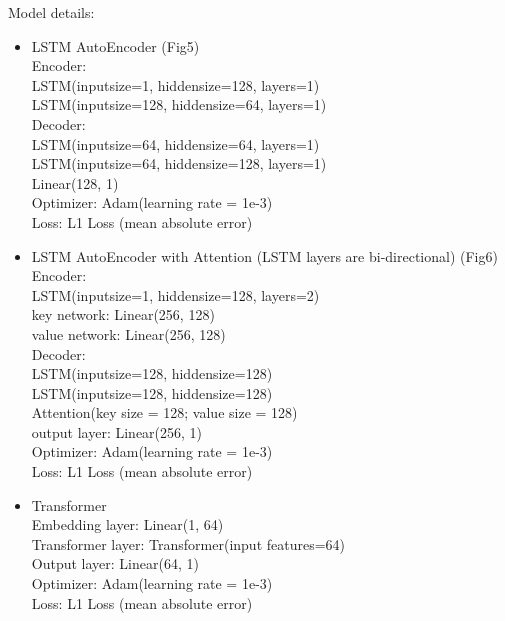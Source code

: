\documentclass{article}
\begin{document}
Model details:

\begin{itemize}
    \item LSTM AutoEncoder (Fig5)\\
    Encoder: \\
    LSTM(inputsize=1, hiddensize=128, layers=1)\\
    LSTM(inputsize=128, hiddensize=64, layers=1) \\
             
    Decoder: \\
    LSTM(inputsize=64, hiddensize=64, layers=1)\\
    LSTM(inputsize=64, hiddensize=128, layers=1)\\
    Linear(128, 1) \\
    
    Optimizer: Adam(learning rate = 1e-3)\\
    Loss: L1 Loss (mean absolute error)
    
    
    \item LSTM AutoEncoder with Attention (LSTM layers are bi-directional) (Fig6) \\
    Encoder: \\
    LSTM(inputsize=1, hiddensize=128, layers=2)\\
    key network: Linear(256, 128) \\
    value network: Linear(256, 128) \\
             
    Decoder: \\
    LSTM(inputsize=128, hiddensize=128)\\
    LSTM(inputsize=128, hiddensize=128)\\
    Attention(key size = 128; value size = 128)\\
    output layer: Linear(256, 1) \\
    
    Optimizer: Adam(learning rate = 1e-3)\\
    Loss: L1 Loss (mean absolute error) \\

    \item Transformer \\
    Embedding layer: Linear(1, 64) \\
    Transformer layer: Transformer(input features=64) \\
    Output layer: Linear(64, 1) \\
    
    Optimizer: Adam(learning rate = 1e-3)\\
    Loss: L1 Loss (mean absolute error) \\
    
\end{itemize}
\end{document}

